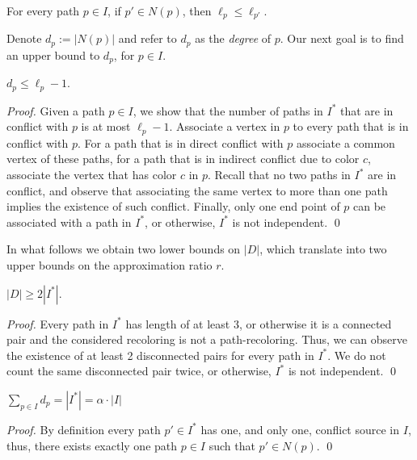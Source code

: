 \begin{observation}
\label{co:dpLeqDp'}
For every path $p \in I$, if $p' \in N(p)$, then $\ell_p \leq \ell_{p'}$.
\end{observation}

Denote $d_p := |N(p)|$ and refer to $d_p$ as the \emph{degree} of $p$.
Our next goal is to find an upper bound to $d_p$, for $p \in I$.

\begin{lemma}
\label{lm:num_in_conflict}
$d_p \leq \ell_p - 1$.
\end{lemma}
\begin{proof}
Given a path $p \in I$, we show that the number of paths in $I^*$ that
are in conflict with $p$ is at most $\ell_p - 1$.
%
Associate a vertex in $p$ to every path that is in conflict with $p$.
For a path that is in direct conflict with $p$ associate a common
vertex of these paths, for a path that is in indirect conflict due to
color $c$, associate the vertex that has color $c$ in $p$.  Recall
that no two paths in $I^*$ are in conflict, and observe that
associating the same vertex to more than one path implies the
existence of such conflict. 
Finally, only one end point of $p$ can be associated with a path in $I^*$, 
or otherwise, $I^*$ is not independent.
\qed{}\end{proof}

In what follows we obtain two lower bounds on $|D|$, which translate
into two upper bounds on the approximation ratio $r$.

\begin{lemma}
\label{lemma:kernel}
$|D| \geq 2|I^*|$.
\end{lemma}
\begin{proof}
Every path in $I^*$ has length of at least 3, or otherwise it is a
connected pair and the considered recoloring is not a path-recoloring.
Thus, we can observe the existence of at least 2 disconnected pairs
for every path in $I^*$.  We do not count the same disconnected pair
twice, or otherwise, $I^*$ is not independent.
\qed{}\end{proof}


\begin{observation}
\label{obs:sum}
$\sum_{p \in I}{d_p} = |I^*| = \alpha \cdot |I|$
\end{observation}
\begin{proof}
By definition every path $p' \in I^*$ has one, and only one, conflict
source in $I$, thus, 
there exists exactly one path $p \in I$ such that $p' \in N(p)$.
\qed{}\end{proof}


